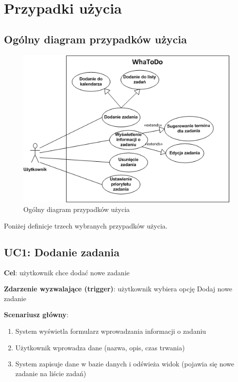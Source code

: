 \documentclass[pdflatex,11pt]{aghdpl}
\begin{document}
\section{Przypadki użycia}

\subsection{Ogólny diagram przypadków użycia}

\begin{figure}[!h]
\centering
\includegraphics[width=\textwidth]{useCase}
\caption{Ogólny diagram przypadków użycia}
\label{fig:przypadki}
\end{figure}

Poniżej definicje trzech wybranych przypadków użycia.

\clearpage

\subsection{UC1: Dodanie zadania}

\textbf{Cel}: użytkownik chce dodać nowe zadanie

\textbf{Zdarzenie wyzwalające (trigger)}: użytkownik wybiera opcję Dodaj nowe zadanie

\textbf{Scenariusz główny}:
\begin{enumerate}
\item System wyświetla formularz wprowadzania informacji o zadaniu
\item Użytkownik wprowadza dane (nazwa, opis, czas trwania)
\item System zapisuje dane w bazie danych i odświeża widok (pojawia się nowe zadanie na liście zadań)
\end{enumerate}
\end{document}
